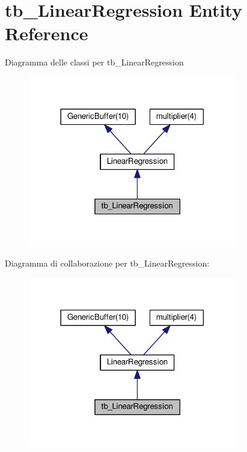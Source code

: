 \hypertarget{classtb___linear_regression}{\section{tb\+\_\+\+Linear\+Regression Entity Reference}
\label{classtb___linear_regression}
}


Diagramma delle classi per tb\+\_\+\+Linear\+Regression\nopagebreak
\begin{figure}[H]
\begin{center}
\leavevmode
\includegraphics[width=258pt]{classtb___linear_regression__inherit__graph}
\end{center}
\end{figure}


Diagramma di collaborazione per tb\+\_\+\+Linear\+Regression\+:\nopagebreak
\begin{figure}[H]
\begin{center}
\leavevmode
\includegraphics[width=258pt]{classtb___linear_regression__coll__graph}
\end{center}
\end{figure}
